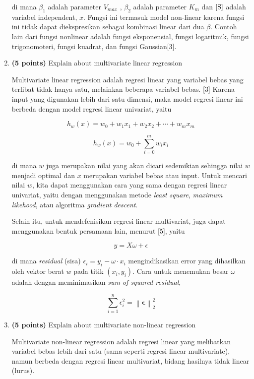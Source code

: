 \documentclass[12pt]{article}%
\begin{document}
\begin{enumerate}
	\par di mana $\beta_1$ adalah parameter $V_{max}$ , $\beta_2$ adalah parameter $ K_m $ dan $\left [ \textup{S} \right ]$ adalah variabel independent, $x$. Fungsi ini termasuk model non-linear karena fungsi ini tidak dapat diekspresikan sebagai kombinasi linear dari dua $\beta$. Contoh lain dari fungsi nonlinear adalah fungsi eksponensial, fungsi logaritmik, fungsi trigonomoteri, fungsi kuadrat, dan fungsi Gaussian[3].

	\item \textbf{(5 points)} Explain about multivariate linear regression 
	\par Multivariate linear regression adalah regresi linear yang variabel bebas yang terlibat tidak hanya satu, melainkan beberapa variabel bebas. [3] Karena input yang digunakan lebih dari satu dimensi, maka model regresi linear ini berbeda dengan model regresi linear univariat, yaitu

		\[h_w(x) = w_0 + w_1x_1 + w_2x_2 + \cdots + w_mx_m\]

		\[h_w(x) = w_0 + \sum_{i=0}^{m}w_ix_i\]

	\par di mana $w$ juga merupakan nilai yang akan dicari sedemikian sehingga nilai $w$ menjadi optimal dan $x$ merupakan variabel bebas atau input. Untuk mencari nilai $w$, kita dapat menggunakan cara yang sama dengan regresi linear univariat, yaitu dengan menggunakan metode \textit{least square}, \textit{maximum likehood}, atau algoritma \textit{gradient descent}.

	\par Selain itu, untuk mendefenisikan regresi linear multivariat, juga dapat menggunakan bentuk persamaan lain, menurut [5], yaitu

		\[y = X\omega + \epsilon\]

	\par di mana \textit{residual} (sisa) $\epsilon_i = y_i - \omega \cdot x_i$ mengindikasikan error yang dihasilkan oleh vektor berat $w$ pada titik $(x_i , y_i)$. Cara untuk menemukan besar $\omega$ adalah dengan meminimasikan \textit{sum of squared residual},

		\[\sum_{i=1}^{n} \epsilon_i^2 = \left \| \mathbf{\epsilon} \right \|^2_2\]


	\item \textbf{(5 points)} Explain about multivariate non-linear regression
	\par Multivariate non-linear regression adalah regresi linear yang melibatkan variabel bebas lebih dari satu (sama seperti regresi linear multivariate), namun berbeda dengan regresi linear multivariat, bidang hasilnya tidak linear (lurus).


\end{enumerate}
\end{document}
